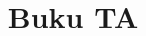\documentclass[12pt, a4paper,twoside, bahasa]{report}
\title{Buku TA}
\begin{document}

\begin{spacing}{1.5}
	
	\cleardoublepage
	
	\cleardoublepage
	
	\cleardoublepage
	
	\cleardoublepage
	
	\cleardoublepage
\end{spacing}
\DaftarPustaka
\DaftarRiwayatHidup
\end{document}
